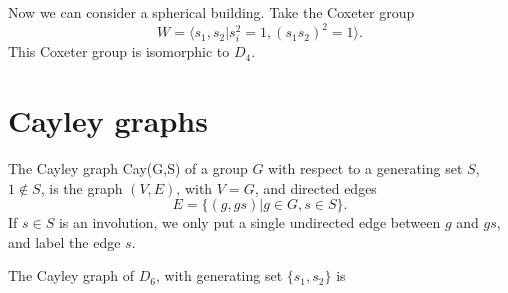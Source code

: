 \documentclass[12pt]{article}
\begin{document}
\begin{example}
    Now we can consider a spherical building. Take the Coxeter group
    \[W=\langle s_1,s_2 | s_i^2=1, (s_1s_2)^2=1\rangle.
    \]
    This Coxeter group is isomorphic to $D_4$. 
\end{example}

\section{Cayley graphs}
\begin{definition}
    The Cayley graph Cay(G,S) of a group $G$ with respect to a generating set $S$, $1\notin S$, is the graph $(V,E)$, with $V=G$, and directed edges
    \[E=\{(g,gs)|g\in G, s\in S\}.\]
    If $s\in S$ is an involution, we only put a single undirected edge between $g$ and $gs$, and label the edge $s$. 
\end{definition}

\begin{example}
    The Cayley graph of $D_6$, with generating set $\{s_1,s_2\}$ is 


\end{example}
\end{document}
